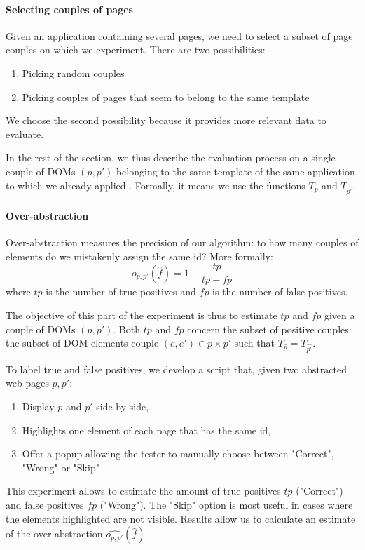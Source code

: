 \paragraph{Selecting couples of pages}
Given an application containing several pages, we need to select a subset of page couples on which we experiment.
There are two possibilities:
\begin{enumerate}
    \item Picking random couples
    \item Picking couples of pages that seem to belong to the same template
\end{enumerate}
We choose the second possibility because it provides more relevant data to evaluate.

In the rest of the section, we thus describe the evaluation process on a single couple of DOMs $(p, p')$ belonging to the same template of the same application to which we already applied \appstract{}. 
Formally, it means we use the functions $T_{\hat{p}}$ and $T_{\hat{p'}}$.

\paragraph{Over-abstraction}
Over-abstraction measures the precision of our algorithm: to how many couples of elements do we mistakenly assign the same id?
More formally:
\begin{equation}
o_{p, p'}(\hat{f}) = 1 - \frac{tp}{tp + fp}
\end{equation}
where $tp$ is the number of true positives and $fp$ is the number of false positives.

The objective of this part of the experiment is thus to estimate $tp$ and $fp$ given a couple of DOMs $(p, p')$.
Both $tp$ and $fp$ concern the subset of positive couples: the subset of DOM elements couple $(e, e') \in p \times p'$ such that $T_{\hat{p}} = T_{\hat{p'}}$.

To label true and false positives, we develop a script that, given two abstracted web pages $p, p'$:
\begin{enumerate}
\item Display $p$ and $p'$ side by side,
\item Highlights one element of each page that has the same id,
\item Offer a popup allowing the tester to manually choose between "Correct", "Wrong" or "Skip"
\end{enumerate}

This experiment allows to estimate the amount of true positives $tp$ ("Correct") and false positives $fp$ ("Wrong").
The "Skip" option is most useful in cases where the elements highlighted are not visible.
Results allow us to calculate an estimate of the over-abstraction $\hat{o_{p, p'}}(\hat{f})$

